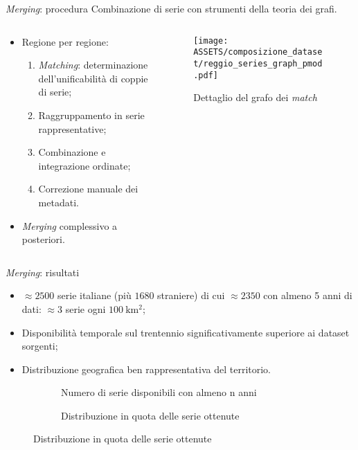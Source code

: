 \begin{frame}[t]{\emph{Merging}: procedura}
  Combinazione di serie con strumenti della teoria dei grafi.
  \begin{columns}
    \begin{column}{0.5\textwidth}
      \begin{itemize}
        \item Regione per regione:
          \begin{enumerate}
            \item \emph{Matching}: determinazione dell'unificabilità di coppie di serie;
            \item Raggruppamento in serie rappresentative;
            \item Combinazione e integrazione ordinate;
            \item Correzione manuale dei metadati.
          \end{enumerate}
        \item \emph{Merging} complessivo a posteriori.
      \end{itemize}
    \end{column}
    \begin{column}{0.5\textwidth}
      \begin{figure}
        \texttt{[image: ASSETS/composizione\_dataset/reggio\_series\_graph\_pmod.pdf]}
        \caption*{Dettaglio del grafo dei \emph{match}}
      \end{figure}

    \end{column}
  \end{columns}
\end{frame}

\begin{frame}{\emph{Merging}: risultati}
  \begin{itemize}
    \item \(\approx 2500\) serie italiane (più \(1680\) straniere) di cui \(\approx 2350\) con almeno 5 anni di dati: \(\approx 3\) serie ogni \(\qty{100}{\kilo\meter^2}\);
    \item Disponibilità temporale sul trentennio significativamente superiore ai dataset sorgenti;
    \item Distribuzione geografica ben rappresentativa del territorio.
  \end{itemize}
  \begin{figure}
    \centering
    \small
    \begin{subfigure}[t]{0.45\textwidth}
      \small
      
      \caption*{Numero di serie disponibili con almeno n anni}
    \end{subfigure}
    \hfill
    \begin{subfigure}[t]{0.45\textwidth}
      \small
      
      \caption*{Distribuzione in quota delle serie ottenute}
    \end{subfigure}
  \end{figure}
\end{frame}

